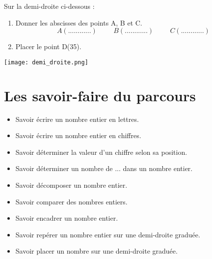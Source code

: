 \documentclass[a4paper,dvipsnames]{article}
\begin{document}
\begin{ExOApp}[]
Sur la demi-droite ci-dessous :

\begin{enumerate}
\item Donner les abscisses des points A, B et C.\\
\[A(............)\hspace{1cm}B(............)\hspace{1cm}C(............)\]
\item Placer le point D(35).
\end{enumerate} 

\begin{center}
    \texttt{[image: demi\_droite.png]}
\end{center}
\end{ExOApp}

\section{Les savoir-faire du parcours}

\begin{CpsCol}
\begin{itemize}
\item Savoir écrire un nombre entier en lettres.
\item Savoir écrire un nombre entier en chiffres.
\item Savoir déterminer la valeur d'un chiffre selon sa position.
\item Savoir déterminer un nombre de ... dans un nombre entier.
\item Savoir décomposer un nombre entier.
\item Savoir comparer des nombres entiers.
\item Savoir encadrer un nombre entier.
\item Savoir repérer un nombre entier sur une demi-droite graduée.
\item Savoir placer un nombre sur une demi-droite graduée.
\end{itemize}
\end{CpsCol}
\end{document}
